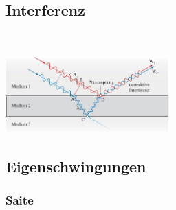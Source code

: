 \subsection{Interferenz}
\begin{center}
	\begin{minipage}{0.2\textwidth}
		
		\\
	\end{minipage}%
	\begin{minipage}{0.3\textwidth}
		\includegraphics[height=3cm,right,keepaspectratio=true]{Images/wellen_interferenz.png}
	\end{minipage}
\end{center}





\subsection{Eigenschwingungen}
\subsubsection{Saite}

